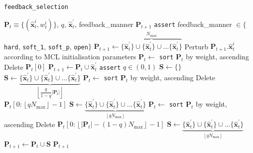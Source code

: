 \begin{algorithm}
  \caption{\texttt{feedback\_selection}}
  \label{alg:feedback_selection}
  \begin{spacing}{1.2}
  \begin{algorithmic}[1]
    \REQUIRE $\bm{P}_t \equiv \{(\hat{\bm{x}}_t^i, w_t^i)\}$, $q$, $\hat{\bm{x}}^\prime_t$, feedback\_manner
    \ENSURE $\bm{P}_{t+1}$
    \STATE \texttt{assert} feedback\_manner $\in \{$\texttt{hard}, \texttt{soft\_1}, \texttt{soft\_p}, \texttt{open}$\}$
      \STATE $\bm{P}_{t+1} \leftarrow \overbrace{\{\hat{\bm{x}}^\prime_t\} \cup \{\hat{\bm{x}}^\prime_t\} \cup \dots \{\hat{\bm{x}}^\prime_t\}}^{N_{\max}}$
      \STATE Perturb $\bm{P}_{t+1}.\hat{\bm{x}}_t^i$ according to MCL initialisation parameters
    \ENDIF
        \STATE $\bm{P}_t \leftarrow$ \texttt{sort} $\bm{P}_t$ by weight, ascending
        \STATE Delete $\bm{P}_t[0]$
      \ENDIF
      \STATE $\bm{\bm{P}}_{t+1} \leftarrow \bm{P}_t \cup \hat{\bm{x}}^\prime_t$
    \ENDIF
      \STATE \texttt{assert} $q \in (0,1)$
      \STATE $\bm{S} \leftarrow \{\}$
        \STATE $\bm{S} \leftarrow \underbrace{\{\hat{\bm{x}}^\prime_t\} \cup \{\hat{\bm{x}}^\prime_t\} \cup \dots \{\hat{\bm{x}}^\prime_t\}}_{\left\lfloor\dfrac{q}{1-q}|\bm{P}_t|\right\rfloor}$
        \STATE $\bm{P}_t \leftarrow$ \texttt{sort} $\bm{P}_t$ by weight, ascending
        \STATE Delete $\bm{P}_t[0: \left\lfloor qN_{\max} \right\rfloor-1]$
        \STATE $\bm{S} \leftarrow \underbrace{\{\hat{\bm{x}}^\prime_t\} \cup \{\hat{\bm{x}}^\prime_t\} \cup \dots \{\hat{\bm{x}}^\prime_t\}}_{\left\lfloor qN_{\max}\right\rfloor}$
      \ELSE
        \STATE $\bm{P}_t \leftarrow$ \texttt{sort} $\bm{P}_t$ by weight, ascending
        \STATE Delete $\bm{P}_t[0: \left\lfloor |\bm{P}_t| - (1-q)N_{\max} \right\rfloor-1]$
        \STATE $\bm{S} \leftarrow \underbrace{\{\hat{\bm{x}}^\prime_t\} \cup \{\hat{\bm{x}}^\prime_t\} \cup \dots \{\hat{\bm{x}}^\prime_t\}}_{\left\lfloor qN_{\max}\right\rfloor}$
      \ENDIF
      \STATE $\bm{P}_{t+1} \leftarrow \bm{P}_{t} \cup \bm{S}$
    \ENDIF
    \ENDIF
    \RETURN $\bm{P}_{t+1}$
  \end{algorithmic}
  \end{spacing}
\end{algorithm}



